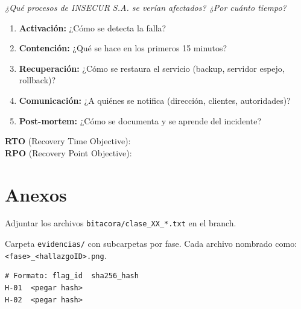 \documentclass[11pt,a4paper]{article}
\begin{document}
\begin{campo}
\textit{¿Qué procesos de INSECUR S.A. se verían afectados? ¿Por cuánto tiempo?}
\vspace{2cm}
\end{campo}

\begin{campo}
\begin{enumerate}
  \item \textbf{Activación:} ¿Cómo se detecta la falla?
  \item \textbf{Contención:} ¿Qué se hace en los primeros 15 minutos?
  \item \textbf{Recuperación:} ¿Cómo se restaura el servicio (backup, servidor espejo, rollback)?
  \item \textbf{Comunicación:} ¿A quiénes se notifica (dirección, clientes, autoridades)?
  \item \textbf{Post-mortem:} ¿Cómo se documenta y se aprende del incidente?
\end{enumerate}
\vspace{2cm}
\end{campo}

\begin{campo}
\textbf{RTO} (Recovery Time Objective): \dotfill \\
\textbf{RPO} (Recovery Point Objective): \dotfill
\end{campo}

\section{Anexos}

\begin{campo}
Adjuntar los archivos \texttt{bitacora/clase\_XX\_*.txt} en el branch.
\end{campo}

\begin{campo}
Carpeta \texttt{evidencias/} con subcarpetas por fase. Cada archivo nombrado como: \texttt{<fase>\_<hallazgoID>.png}.
\end{campo}

\begin{campo}
\begin{lstlisting}
# Formato: flag_id  sha256_hash
H-01  <pegar hash>
H-02  <pegar hash>
\end{lstlisting}
\end{campo}
\end{document}
